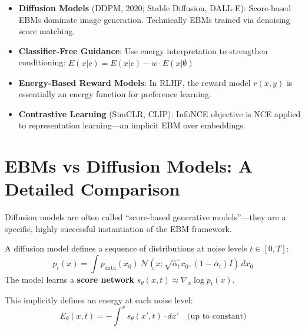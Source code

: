 \begin{remark}\leavevmode
    \begin{itemize}
        \item \textbf{Diffusion Models} (DDPM, 2020; Stable Diffusion, DALL-E): Score-based EBMs dominate image generation. Technically EBMs trained via denoising score matching.

        \item \textbf{Classifier-Free Guidance}: Use energy interpretation to strengthen conditioning: $\tilde{E}(x|c) = E(x|c) - w \cdot E(x|\emptyset)$

        \item \textbf{Energy-Based Reward Models}: In RLHF, the reward model $r(x, y)$ is essentially an energy function for preference learning.

        \item \textbf{Contrastive Learning} (SimCLR, CLIP): InfoNCE objective is NCE applied to representation learning---an implicit EBM over embeddings.
    \end{itemize}
\end{remark}

\section{EBMs vs Diffusion Models: A Detailed Comparison}

Diffusion models are often called ``score-based generative models''---they are a specific, highly successful instantiation of the EBM framework.

\begin{definition}
    A diffusion model defines a sequence of distributions at noise levels $t \in [0, T]$:
    \[
        p_t(x) = \int p_{\text{data}}(x_0) \, \mathcal{N}(x; \sqrt{\bar{\alpha}_t} x_0, (1 - \bar{\alpha}_t) I) \, dx_0
    \]
    The model learns a \textbf{score network} $s_\theta(x, t) \approx \nabla_x \log p_t(x)$.

    This implicitly defines an energy at each noise level:
    \[
        E_\theta(x, t) = -\int^x s_\theta(x', t) \cdot dx' \quad \text{(up to constant)}
    \]
\end{definition}

